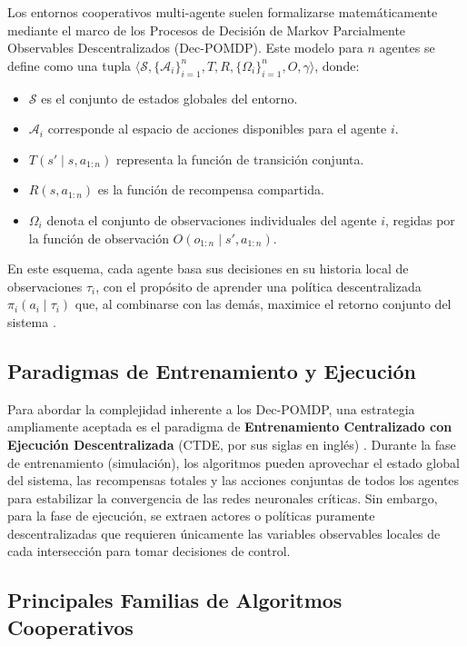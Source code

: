 Los entornos cooperativos multi-agente suelen formalizarse matemáticamente mediante el marco de los Procesos de Decisión de Markov Parcialmente Observables Descentralizados (Dec-POMDP). Este modelo para $n$ agentes se define como una tupla $\langle \mathcal{S}, \{ \mathcal{A}_i \}_{i=1}^n, T, R, \{ \Omega_i \}_{i=1}^n, O, \gamma \rangle$, donde:
\begin{itemize}
  \item $\mathcal{S}$ es el conjunto de estados globales del entorno.
  \item $\mathcal{A}_i$ corresponde al espacio de acciones disponibles para el agente $i$.
  \item $T(s' \mid s, a_{1:n})$ representa la función de transición conjunta.
  \item $R(s, a_{1:n})$ es la función de recompensa compartida.
  \item $\Omega_i$ denota el conjunto de observaciones individuales del agente $i$, regidas por la función de observación $O(o_{1:n} \mid s', a_{1:n})$.
\end{itemize}
En este esquema, cada agente basa sus decisiones en su historia local de observaciones $\tau_i$, con el propósito de aprender una política descentralizada $\pi_i(a_i \mid \tau_i)$ que, al combinarse con las demás, maximice el retorno conjunto del sistema \cite{decpomdp-survey}.

\subsection{Paradigmas de Entrenamiento y Ejecución}

Para abordar la complejidad inherente a los Dec-POMDP, una estrategia ampliamente aceptada es el paradigma de \textbf{Entrenamiento Centralizado con Ejecución Descentralizada} (CTDE, por sus siglas en inglés) \cite{ctde_survey}. Durante la fase de entrenamiento (simulación), los algoritmos pueden aprovechar el estado global del sistema, las recompensas totales y las acciones conjuntas de todos los agentes para estabilizar la convergencia de las redes neuronales críticas. Sin embargo, para la fase de ejecución, se extraen actores o políticas puramente descentralizadas que requieren únicamente las variables observables locales de cada intersección para tomar decisiones de control.

\subsection{Principales Familias de Algoritmos Cooperativos}

